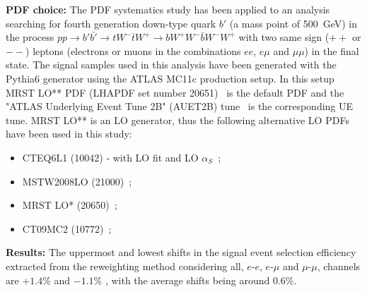 \vspace{0.4cm}
\noindent
{\bf PDF choice:}
The PDF systematics study has been applied to an analysis searching for fourth generation down-type 
quark $b'$ (a mass point of 500~GeV) in the process 
$pp \rightarrow b'\bar{b'}\rightarrow tW^-\bar{t}W^+ \rightarrow bW^+W^-\bar{b}W^-W^+$ with two same 
sign ($+ +$ or $- -$) leptons (electrons or muons in the combinations $e e$, $e \mu$ and $\mu \mu$) 
in the final state. The signal samples used in this analysis have been generated with the Pythia6 
generator using the ATLAS MC11c production setup. In this setup MRST LO** PDF (LHAPDF set number 
20651)~\cite{LOstar,LOstarstar} is the default PDF and the "ATLAS Underlying Event Tune 2B" (AUET2B)
tune~\cite{AUET2B} is the corresponding UE tune. MRST LO** is an LO generator, thus the following 
alternative LO PDFs have been used in this study:
\begin{itemize}
%
\item CTEQ6L1 (10042) - with LO fit and LO $\alpha_S$~\cite{CTEQ6};
%
\item MSTW2008LO (21000)~\cite{MSTW2008LO};
%
\item MRST LO* (20650)~\cite{MRSTLOX};
%
\item CT09MC2 (10772)~\cite{CT09MC2};
%
\end{itemize}


\vspace{0.4cm}
\noindent
{\bf Results:}
The uppermost and lowest shifts in the signal event selection efficiency extracted from the reweighting method
considering all, $e$-$e$, $e$-$\mu$ and $\mu$-$\mu$, channels are $+1.4$\% and $-1.1$\% , with the average 
shifts being around 0.6\%.


